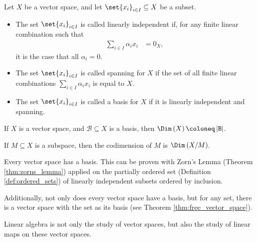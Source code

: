 \begin{definition}
  Let $X$ be a vector space, and let $\set{x_i}_{i\in I}\subseteq X$ be a subset.
  \begin{itemize}
    \item The set $\set{x_i}_{i\in I}$ is called linearly independent if, for any finite linear combination such that
      \begin{align*}
        \sum_{i\in I}\alpha_ix_i &= 0_X,
      \end{align*}
      it is the case that all $\alpha_i = 0$.
    \item The set $\set{x_i}_{i\in I}$ is called spanning for $X$ if the set of all finite linear combinations $\sum_{i\in I}\alpha_ix_i$ is equal to $X$.
    \item The set $\set{x_i}_{i\in I}$ is called a basis for $X$ if it is linearly independent and spanning.
  \end{itemize}
\end{definition}
\begin{definition}
  If $X$ is a vector space, and $\mathcal{B}\subseteq X$ is a basis, then $\Dim\left(X\right)\coloneq \left\vert \mathcal{B} \right\vert$.\newline

  If $M\subseteq X$ is a subspace, then the codimension of $M$ is $\Dim\left(X/M\right)$.
\end{definition}
\begin{remark}
  Every vector space has a basis. This can be proven with Zorn's Lemma (Theorem \ref{thm:zorns_lemma}) applied on the partially ordered set (Definition \ref{def:ordered_sets}) of linearly independent subsets ordered by inclusion.\newline

  Additionally, not only does every vector space have a basis, but for any set, there is a vector space with the set as its basis (see Theorem \ref{thm:free_vector_space}).
\end{remark}
Linear algebra is not only the study of vector spaces, but also the study of linear maps on these vector spaces. 
